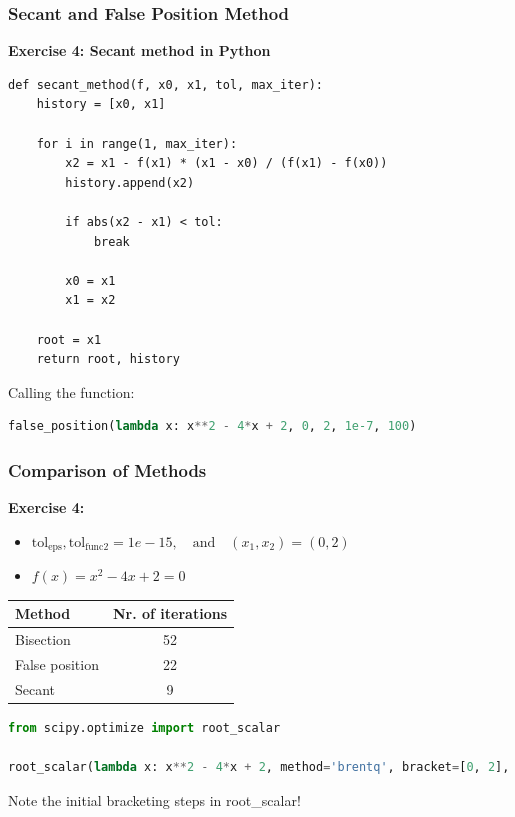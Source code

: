 \begin{frame}[fragile]
  \frametitle{Secant and False Position Method}

  \textbf{Exercise 4: Secant method in Python}
  \begin{lstlisting}
def secant_method(f, x0, x1, tol, max_iter):
    history = [x0, x1]
    
    for i in range(1, max_iter):
        x2 = x1 - f(x1) * (x1 - x0) / (f(x1) - f(x0))
        history.append(x2)

        if abs(x2 - x1) < tol:
            break

        x0 = x1
        x1 = x2

    root = x1
    return root, history
  \end{lstlisting}

  Calling the function:
  \begin{lstlisting}[language=Python, basicstyle=\small]
false_position(lambda x: x**2 - 4*x + 2, 0, 2, 1e-7, 100)
  \end{lstlisting}
\end{frame}

\begin{frame}[fragile]
  \frametitle{Comparison of Methods}

  \textbf{Exercise 4:}
  \begin{itemize}
    \item \( \text{tol}_{\text{eps}}, \text{tol}_{\text{func2}} = 1e-15, \quad \text{and} \quad (x_1, x_2) = (0,2) \)
    \item \( f(x) = x^2 - 4x + 2 = 0 \)
  \end{itemize}

  \begin{table}
    \begin{tabular}{|l|c|}
      \hline
      Method         & Nr. of iterations \\
      \hline
      Bisection      & 52                \\
      False position & 22                \\
      Secant         & 9                 \\
      \hline
    \end{tabular}
  \end{table}

  \begin{lstlisting}[language=Python, basicstyle=\small]
from scipy.optimize import root_scalar

root_scalar(lambda x: x**2 - 4*x + 2, method='brentq', bracket=[0, 2], xtol=1e-15)
  \end{lstlisting}

  Note the initial bracketing steps in root\_scalar!
\end{frame}

